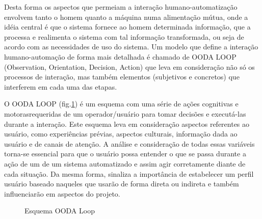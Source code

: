 \documentclass[12pt,a4paper]{article}
\begin{document}
Desta forma os aspectos que permeiam a interação humano-automatização envolvem tanto o homem quanto a máquina numa alimentação mútua, 
onde a idéia central é que o sistema fornece ao homem determinada informação, que a processa e realimenta o sistema com tal informação 
transformada, ou seja de acordo com as necessidades de uso do sistema. 
Um modelo que define a interação humano-automação de forma mais detalhada é chamado de OODA LOOP (Observation, Orientation, Decision, Action) 
\cite{sheridan2005human} que leva em
consideração não só os processos de interação, mas também elementos (subjetivos e concretos) que interferem em cada uma das etapas. 

O OODA LOOP (fig.\ref{fig:ooda}) é um esquema com uma série de ações
cognitivas e motorasrequeridas de um operador/usuário para tomar decisões e executá-las durante a interação. Este esquema leva em consideração aspectos referentes ao usuário, como experiências prévias, aspectos culturais, informação 
dada ao usuário e de canais de atenção. A análise e consideração de todas essas variáveis torna-se essencial para que o usuário possa entender o 
que se passa durante a ação de um de um sistema automatizado e assim agir corretamente diante de cada situação. Da mesma forma, sinaliza a 
importância de estabelecer um perfil usuário baseado naqueles que usarão de forma direta ou indireta e também influenciarão em aspectos do projeto.

\begin{figure}[h!]
\begin{center}
  \caption{Esquema OODA Loop}
  \label{fig:ooda}
\end{center}
\end{figure} 
 
\end{document}
